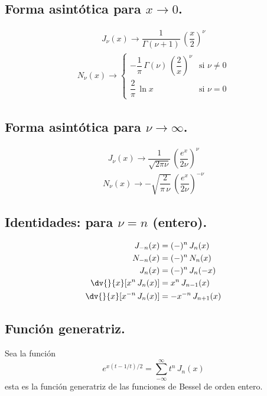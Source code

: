 \subsection{Forma asintótica para $x \to 0$.}
\begin{align*}
J_{\nu} (x) \to \dfrac{1}{\Gamma (\nu + 1)} \, \left( \dfrac{x}{2} \right)^{\nu}
\end{align*}
\begin{align*}
N_{\nu} (x) \to 
\begin{cases}
- \dfrac{1}{\pi} \, \Gamma (\nu) \, \left( \dfrac{2}{x} \right)^{\nu} & \mbox{si } \nu \neq 0  \\
\dfrac{2}{\pi} \, \ln x & \mbox{si } \nu = 0 
\end{cases}
\end{align*}
\subsection{Forma asintótica para $\nu \to \infty$.}
\begin{align*}
J_{\nu} (x) \to \dfrac{1}{\sqrt{2 \pi \nu}} \, \left( \dfrac{e^{x}}{2 \nu} \right)^{\nu}
\end{align*}
\begin{align*}
N_{\nu} (x) \to - \sqrt{\dfrac{2}{\pi \, \nu}} \, \left( \dfrac{e^{x}}{2 \nu} \right)^{- \nu}
\end{align*}
\subsection{Identidades: para $\nu = n$ (entero).}
\begin{align*}
J_{-n} (x) &= (-)^{n} \, J_{n}(x) \\
N_{-n} (x) &= (-)^{n} \, N_{n}(x) \\
J_{n} (x) &= (-)^{n} \, J_{n}(-x) \\
\dv{}{x} [x^{n} \, J_{n}(x)] &=  x^{n} \, J_{n-1}(x) \\
\dv{}{x} [x^{-n} \, J_{n}(x)] &=  -x^{-n} \, J_{n+1}(x)
\end{align*}
\subsection{Función generatriz.}
Sea la función
\[ e^{x(t-1/t)/2} = \sum_{-\infty}^{\infty} t^{n} \, J_{n} (x) \]
esta es la función generatriz de las funciones de Bessel de orden entero.
